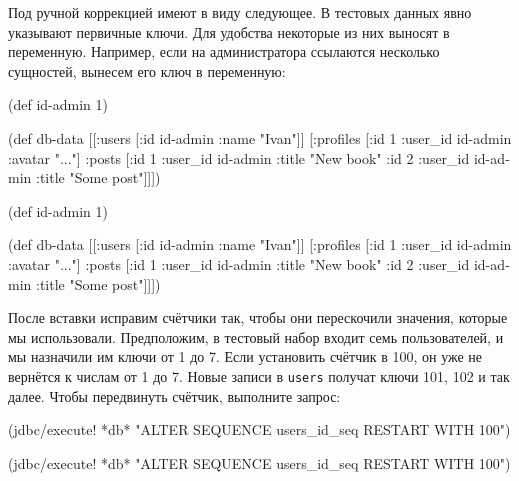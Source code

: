 Под ручной коррекцией имеют в виду следующее. В тестовых данных явно указывают
первичные ключи. Для удобства некоторые из них выносят в переменную. Например,
если на администратора ссылаются несколько сущностей, вынесем его ключ в
переменную:

\ifnarrow

\begin{english}
  \begin{clojure}
(def id-admin 1)

(def db-data
  [[:users [{:id id-admin
             :name "Ivan"}]]
   [:profiles [{:id 1
                :user_id id-admin
                :avatar "..."}]
    :posts [{:id 1
             :user_id id-admin
             :title "New book"}
            {:id 2
             :user_id id-admin
             :title "Some post"}]]])
  \end{clojure}
\end{english}

\else

\begin{english}
  \begin{clojure}
(def id-admin 1)

(def db-data
  [[:users [{:id id-admin :name "Ivan"}]]
   [:profiles [{:id 1 :user_id id-admin :avatar "..."}]
    :posts [{:id 1 :user_id id-admin
             :title "New book"}
            {:id 2 :user_id id-admin
             :title "Some post"}]]])
  \end{clojure}
\end{english}

\fi


После вставки исправим счётчики так, чтобы они перескочили значения, которые мы
использовали. Предположим, в тестовый набор входит семь пользователей, и мы
назначили им ключи от 1 до 7. Если установить счётчик в 100, он уже не вернётся
к числам от 1 до 7. Новые записи в \verb|users| получат ключи 101, 102 и так
далее. Чтобы передвинуть счётчик, выполните запрос:

\ifnarrow

\begin{english}
  \begin{clojure}
(jdbc/execute! *db*
  "ALTER SEQUENCE users_id_seq
   RESTART WITH 100")
  \end{clojure}
\end{english}

\else

\begin{english}
  \begin{clojure}
(jdbc/execute! *db*
  "ALTER SEQUENCE users_id_seq RESTART WITH 100")
  \end{clojure}
\end{english}

